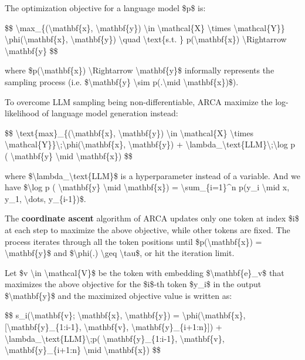 The optimization objective for a language model \$p\$ is:

\$\$ \textbackslash max\_\{(\textbackslash mathbf\{x\}, \textbackslash mathbf\{y\}) \textbackslash in \textbackslash mathcal\{X\} \textbackslash times \textbackslash mathcal\{Y\}\} \textbackslash phi(\textbackslash mathbf\{x\}, \textbackslash mathbf\{y\}) \textbackslash quad \textbackslash text\{s.t. \} p(\textbackslash mathbf\{x\}) \textbackslash Rightarrow \textbackslash mathbf\{y\} \$\$

where \$p(\textbackslash mathbf\{x\}) \textbackslash Rightarrow \textbackslash mathbf\{y\}\$ informally represents the sampling process (i.e. \$\textbackslash mathbf\{y\} \textbackslash sim p(.\textbackslash mid \textbackslash mathbf\{x\})\$).

To overcome LLM sampling being non-differentiable, ARCA maximize the log-likelihood of language model generation instead:

\$\$ \textbackslash text\{max\}\_\{(\textbackslash mathbf\{x\}, \textbackslash mathbf\{y\}) \textbackslash in \textbackslash mathcal\{X\} \textbackslash times \textbackslash mathcal\{Y\}\}\textbackslash;\textbackslash phi(\textbackslash mathbf\{x\}, \textbackslash mathbf\{y\}) + \textbackslash lambda\_\textbackslash text\{LLM\}\textbackslash;\textbackslash log p ( \textbackslash mathbf\{y\} \textbackslash mid \textbackslash mathbf\{x\}) \$\$

where \$\textbackslash lambda\_\textbackslash text\{LLM\}\$ is a hyperparameter instead of a variable. And we have \$\textbackslash log p ( \textbackslash mathbf\{y\} \textbackslash mid \textbackslash mathbf\{x\}) = \textbackslash sum\_\{i=1\}\^{}n p(y\_i \textbackslash mid x, y\_1, \textbackslash dots, y\_\{i-1\})\$.

The \textbf{coordinate ascent} algorithm of ARCA updates only one token at index \$i\$ at each step to maximize the above objective, while other tokens are fixed. The process iterates through all the token positions until \$p(\textbackslash mathbf\{x\}) = \textbackslash mathbf\{y\}\$ and \$\textbackslash phi(.) \textbackslash geq \textbackslash tau\$, or hit the iteration limit.

Let \$v \textbackslash in \textbackslash mathcal\{V\}\$ be the token with embedding \$\textbackslash mathbf\{e\}\_v\$ that maximizes the above objective for the \$i\$-th token \$y\_i\$ in the output \$\textbackslash mathbf\{y\}\$ and the maximized objective value is written as:

\$\$ s\_i(\textbackslash mathbf\{v\}; \textbackslash mathbf\{x\}, \textbackslash mathbf\{y\}) = \textbackslash phi(\textbackslash mathbf\{x\}, {[}\textbackslash mathbf\{y\}\_\{1:i-1\}, \textbackslash mathbf\{v\}, \textbackslash mathbf\{y\}\_\{i+1:n\}{]}) + \textbackslash lambda\_\textbackslash text\{LLM\}\textbackslash;p( \textbackslash mathbf\{y\}\_\{1:i-1\}, \textbackslash mathbf\{v\}, \textbackslash mathbf\{y\}\_\{i+1:n\} \textbackslash mid \textbackslash mathbf\{x\}) \$\$

